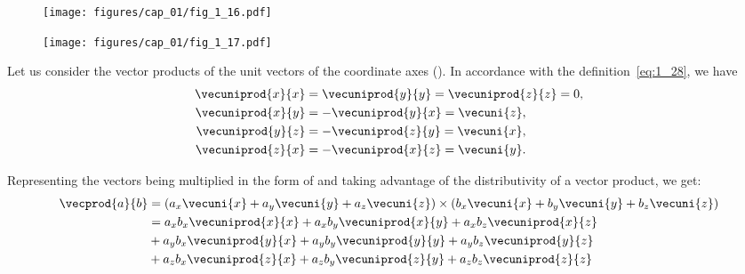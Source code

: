 \begin{figure}[t]
	\begin{minipage}[t]{0.5\linewidth}
		\begin{center}
			\texttt{[image: figures/cap\_01/fig\_1\_16.pdf]}
			\caption[]{}
			\label{fig:1_16}
		\end{center}
	\end{minipage}
	\hfill{ }%
	\begin{minipage}[t]{0.5\linewidth}
		\begin{center}
			\texttt{[image: figures/cap\_01/fig\_1\_17.pdf]}
			\caption[]{}
			\label{fig:1_17}
		\end{center}
	\end{minipage}
	\vspace{-0.3cm}
\end{figure}

Let us consider the vector products of the unit vectors of the coordinate axes (). In accordance with the definition~\eqref{eq:1_28}, we have
\begin{align}
\vecuniprod{x}{x} &= \vecuniprod{y}{y} = \vecuniprod{z}{z} = 0,\nonumber\\
\vecuniprod{x}{y} &= -\vecuniprod{y}{x} = \vecuni{z},\label{eq:1_31}\\
\vecuniprod{y}{z} &= -\vecuniprod{z}{y} = \vecuni{x},\nonumber\\
\vecuniprod{z}{x} &= -\vecuniprod{x}{z} = \vecuni{y}.\nonumber
\end{align}

\noindent
Representing the vectors being multiplied in the form of  and taking advantage of the distributivity of a vector product, we get:
\begin{align*}
\vecprod{a}{b} &= (a_x\vecuni{x}+a_y\vecuni{y}+a_z\vecuni{z})\times(b_x\vecuni{x}+b_y\vecuni{y}+b_z\vecuni{z})\\
&= a_xb_x\vecuniprod{x}{x} + a_xb_y\vecuniprod{x}{y} + a_xb_z\vecuniprod{x}{z}\\
&+ a_yb_x\vecuniprod{y}{x} + a_yb_y\vecuniprod{y}{y} + a_yb_z\vecuniprod{y}{z}\\
&+ a_zb_x\vecuniprod{z}{x} + a_zb_y\vecuniprod{z}{y} + a_zb_z\vecuniprod{z}{z}
\end{align*}

